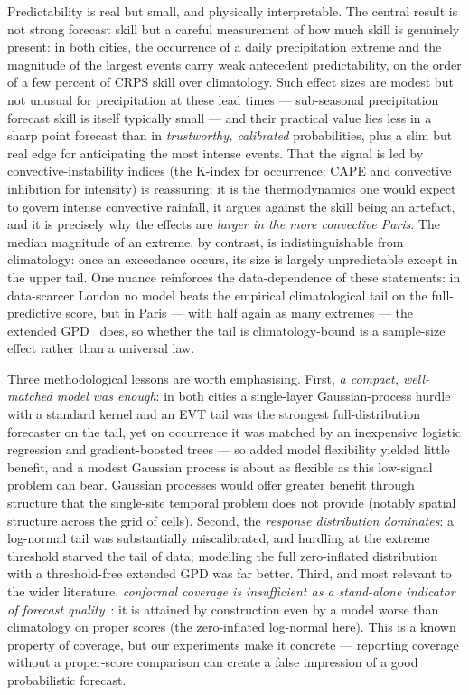 \documentclass[11pt,a4paper]{article}
\begin{document}
Predictability is real but small, and physically interpretable.
The central result is not strong forecast skill but a careful measurement of how much skill is genuinely present: in both
cities, the occurrence of a daily precipitation extreme and the magnitude of the
largest events carry weak antecedent predictability, on the order of a few percent
of CRPS skill over climatology. Such effect sizes are modest but not unusual for
precipitation at these lead times --- sub-seasonal precipitation forecast skill is
itself typically small --- and their practical value lies less in a sharp point
forecast than in \emph{trustworthy, calibrated} probabilities, plus a slim but
real edge for anticipating the most intense events. That the signal is led by
convective-instability indices (the K-index for occurrence; CAPE and convective
inhibition for intensity) is reassuring: it is the thermodynamics one would expect
to govern intense convective rainfall, it argues against the skill being an
artefact, and it is precisely why the effects are \emph{larger in the more
convective Paris}. The median magnitude of an extreme, by contrast, is
indistinguishable from climatology: once an exceedance occurs, its size is largely
unpredictable except in the upper tail. One nuance reinforces the data-dependence
of these statements: in data-scarcer London no model beats the empirical
climatological tail on the full-predictive score, but in Paris --- with half again
as many extremes --- the extended GPD~\citep{davison1990,coles2001evt} does, so whether the tail is climatology-bound
is a sample-size effect rather than a universal law.

Three methodological lessons are worth emphasising. First,
\emph{a compact, well-matched model was enough}: in both cities a single-layer
Gaussian-process hurdle with a standard kernel and an EVT tail was the strongest
full-distribution forecaster on the tail, yet on occurrence it was matched by an
inexpensive logistic regression and gradient-boosted trees --- so added model
flexibility yielded little benefit, and a modest Gaussian process is about as
flexible as this low-signal problem can bear. Gaussian processes would
offer greater benefit through structure that the single-site temporal problem does
not provide (notably spatial structure across the grid of cells). Second, the
\emph{response distribution dominates}: a log-normal tail was substantially
miscalibrated, and hurdling at the extreme threshold starved the tail of data;
modelling the full zero-inflated distribution with a threshold-free extended GPD
was far better. Third, and most relevant to the wider literature, \emph{conformal
coverage is insufficient as a stand-alone indicator of forecast quality}~\citep{gneiting2007scoring,lerch2017dilemma}: it is
attained by construction even by a model worse than climatology on proper scores
(the zero-inflated log-normal here). This is a known property of coverage, but our
experiments make it concrete --- reporting coverage without a proper-score
comparison can create a false impression of a good probabilistic forecast.
\end{document}
